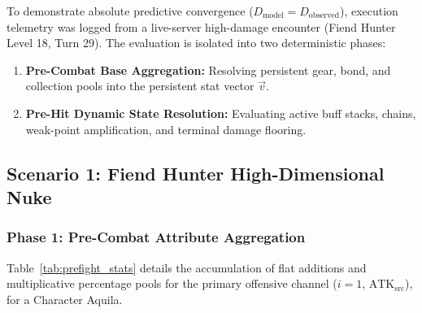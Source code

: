 \documentclass[twocolumn,10pt]{article}
\begin{document}
To demonstrate absolute predictive convergence ($D_{\text{model}} = D_{\text{observed}}$), execution telemetry was logged from a live-server high-damage encounter (Fiend Hunter Level 18, Turn 29). The evaluation is isolated into two deterministic phases:
\begin{enumerate}
    \item \textbf{Pre-Combat Base Aggregation:} Resolving persistent gear, bond, and collection pools into the persistent stat vector $\vec{v}$.
    \item \textbf{Pre-Hit Dynamic State Resolution:} Evaluating active buff stacks, chains, weak-point amplification, and terminal damage flooring.
\end{enumerate}

\subsection{Scenario 1: Fiend Hunter High-Dimensional Nuke}

\subsubsection{Phase 1: Pre-Combat Attribute Aggregation}
Table~\ref{tab:prefight_stats} details the accumulation of flat additions and multiplicative percentage pools for the primary offensive channel ($i=1$, $\text{ATK}_{\text{src}}$), for a Character Aquila.
\end{document}

